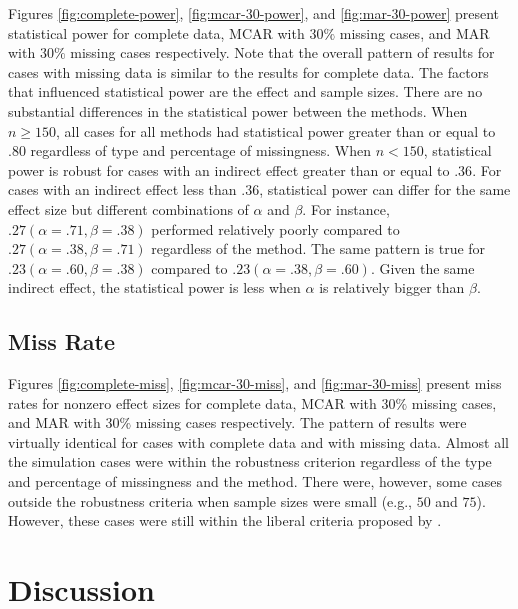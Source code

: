 \documentclass[man]{apa7}\usepackage[]{graphicx}\usepackage[]{xcolor}
\begin{document}
Figures
\ref{fig:complete-power},
\ref{fig:mcar-30-power},
and
\ref{fig:mar-30-power}
present statistical power for
complete data,
MCAR with $30\%$ missing cases,
and
MAR with $30\%$ missing cases respectively.
Note that the overall pattern of results for cases with missing data is similar
to the results for complete data.
The factors that influenced statistical power are the effect and sample sizes.
There are no substantial differences in the statistical power between the methods.
When $n \geq 150$,
all cases for all methods had statistical power greater than
or equal to $.80$ regardless of type and percentage of missingness.
When $n < 150$,
statistical power is robust for cases with an indirect effect greater than or equal to $.36$.
For cases with an indirect effect less than $.36$,
statistical power can differ
for the same effect size
but different combinations of ${\alpha}$ and ${\beta}$.
For instance,
$.27(\alpha = .71, \beta = .38)$ performed relatively poorly
compared to
$.27(\alpha = .38, \beta = .71)$
regardless of the method.
The same pattern is true for
$.23(\alpha = .60, \beta = .38)$
compared to
$.23(\alpha = .38, \beta = .60)$.
Given the same indirect effect,
the statistical power is less when
${\alpha}$
is relatively bigger than 
${\beta}$.

\subsection{Miss Rate}

Figures
\ref{fig:complete-miss},
\ref{fig:mcar-30-miss},
and
\ref{fig:mar-30-miss}
present miss rates for nonzero effect sizes
for complete data,
MCAR with 
$30\%$
missing cases,
and MAR with
$30\%$
missing cases
respectively.
The pattern of results were virtually identical
for cases with complete data and with missing data.
Almost all the simulation cases were within the robustness criterion
regardless of the type and percentage of missingness and the method.
There were,
however,
some cases outside the robustness criteria
when sample sizes were small
(e.g.,
$50$
and
$75$).
However,
these cases were still within the liberal criteria proposed by
\Textcite{Lib-Simulation-Robustness-Bradley-1978}.

\section{Discussion}
\end{document}

